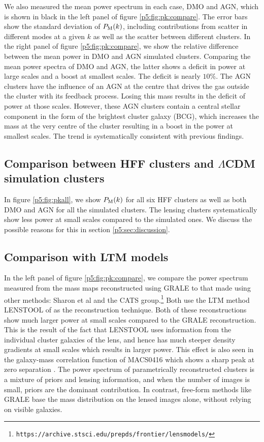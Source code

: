 \documentclass[
  11pt,
  twoside,
  openright,
  titlepage,
  headings=optiontoheadandtoc
]{scrbook}
\begin{document}
We also measured the mean power spectrum in each case, DMO and AGN, which is shown in black
in the left panel of figure \ref{p5:fig:pk:compare}.
The error bars show the standard deviation of $P_{\rm M}(k)$, including contributions from
scatter in different modes at a given $k$ as well as the scatter between different clusters.
In the right panel of figure \ref{p5:fig:pk:compare}, we show
the relative difference between the mean power in DMO and AGN simulated clusters.
Comparing the mean power spectra of DMO and AGN, the latter shows a deficit in power
at large scales and a boost at smallest scales. The deficit is nearly $10\%$.
The AGN clusters have the influence of an AGN at the centre that drives the gas
outside the cluster with its feedback process. Losing this mass results in the
deficit of power at those scales. However, these AGN clusters contain a central
stellar component in the form of the brightest cluster galaxy (BCG),
which increases the mass at the very centre of the
cluster resulting in a boost in the power at smallest scales.
The trend is systematically consistent with previous findings.


\subsection{Comparison between HFF clusters and
  \texorpdfstring{$\Lambda$CDM}{Lambda-CDM} simulation clusters}

In figure \ref{p5:fig:pkall}, we show $P_{\rm M}(k)$ for all six HFF clusters as
well as both DMO and AGN for all the simulated clusters.
The lensing clusters systematically show less power at small scales
compared to the simulated ones.
We discuss the possible reasons for this in
section \ref{p5:sec:discussion}.


\subsection{Comparison with LTM models}


In the left panel of figure \ref{p5:fig:pk:compare}, we compare the power spectrum measured
from the mass maps reconstructed using GRALE to that made using other methods:
Sharon et al and the CATS group.\footnote{\tt https://archive.stsci.edu/prepds/frontier/lensmodels/}
Both use the LTM method LENSTOOL of \cite{2007NJPh....9..447J} as the reconstruction technique.
Both of these reconstructions show much larger
power at small scales compared to the GRALE reconstruction. This is the result of the fact that LENSTOOL uses
information from the individual cluster galaxies of the lens, and
hence has much steeper density gradients at small scales which results in
larger power. This effect is also seen in the galaxy-mass correlation function of
MACS0416 which shows a sharp peak at zero separation \citep{2015arXiv150708960S}.
The power spectrum of parametrically reconstructed clusters is a mixture
of priors and lensing information, and when the number of images is small, priors
are the dominant contribution.
In contrast, free-form methods like GRALE base the mass
distribution on the lensed images alone, without relying on visible galaxies.
\end{document}
